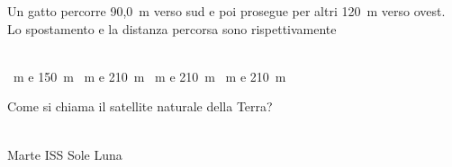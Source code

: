 \documentclass[a4paper,11pt]{exam}
\begin{document}
\begin{questions}
    
\question Un gatto percorre 90,0~m verso sud e poi prosegue per altri 120~m verso ovest. Lo spostamento e la distanza percorsa sono rispettivamente\\\
\begin{oneparchoices}
  ~m e 150~m
  ~m e 210~m
  ~m e 210~m
  ~m e 210~m
\end{oneparchoices}

    
\question Come si chiama il satellite naturale della Terra?\\\
\begin{oneparchoices}
  \choice Marte
  \choice ISS
  \choice Sole
  \choice Luna
\end{oneparchoices}

    
\end{questions}

    
    \newpage
    
    
\end{document}
